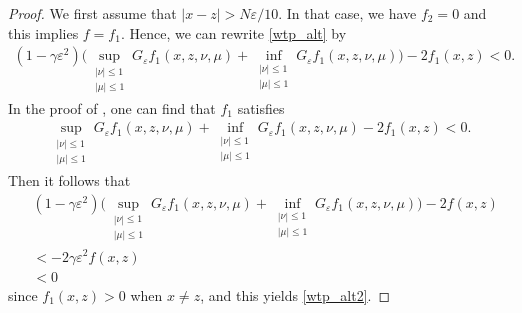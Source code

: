 \documentclass[english]{amsart}
\newcommand{\eps}{\varepsilon}
\theoremstyle{plain}
\theoremstyle{definition}
\theoremstyle{remark}
\numberwithin{equation}{section}
\begin{document}
\begin{proof}
We first assume that $|x-z|> N\eps/10$.
In that case, we have $ f_2=0$ and this implies $f=f_1$.
Hence, we can rewrite \eqref{wtp_alt} by
\begin{align}\label{wtp_alt2}
(1-\gamma\eps^2) \bigg(\sup_{\substack{|\nu|\le1\\|\mu|\le1}}G_{\eps}f_1(x,z,\nu,\mu)
+\inf_{\substack{|\nu|\le1\\|\mu|\le1}}G_{\eps}f_1(x,z,\nu,\mu)\bigg)-2f_1(x,z)<0.
\end{align}
In the proof of \cite[Lemma 5.2]{MR4125101}, one can find that $f_1$ satisfies
\begin{align}
\sup_{\substack{|\nu|\le1\\|\mu|\le1}}G_{\eps}f_1(x,z,\nu,\mu)
+\inf_{\substack{|\nu|\le1\\|\mu|\le1}}G_{\eps}f_1(x,z,\nu,\mu)-2f_1(x,z)<0.
\end{align}
Then it follows that 
\begin{align*}
 & (1-\gamma\eps^2) \bigg(\sup_{\substack{|\nu|\le1\\|\mu|\le1}}G_{\eps}f_1(x,z,\nu,\mu)
+\inf_{\substack{|\nu|\le1\\|\mu|\le1}}G_{\eps}f_1(x,z,\nu,\mu)\bigg)-2f(x,z)  
\\ & < -2\gamma\eps^2f(x,z)
\\ & <0
\end{align*}
since $f_1(x,z)>0$ when $x\neq z$, and this yields \eqref{wtp_alt2}.


\end{proof}
\end{document}
